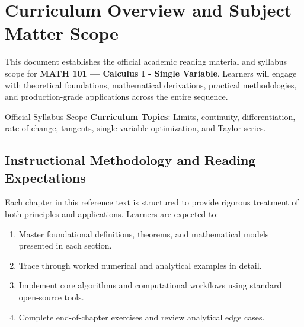 \section{Curriculum Overview and Subject Matter Scope}

This document establishes the official academic reading material and syllabus scope for \textbf{MATH 101 --- Calculus I - Single Variable}. Learners will engage with theoretical foundations, mathematical derivations, practical methodologies, and production-grade applications across the entire sequence.

\begin{InsightBox}{Official Syllabus Scope}
  \textbf{Curriculum Topics}: Limits, continuity, differentiation, rate of change, tangents, single-variable optimization, and Taylor series.
\end{InsightBox}

\subsection{Instructional Methodology and Reading Expectations}

Each chapter in this reference text is structured to provide rigorous treatment of both principles and applications. Learners are expected to:
\begin{enumerate}
  \item Master foundational definitions, theorems, and mathematical models presented in each section.
  \item Trace through worked numerical and analytical examples in detail.
  \item Implement core algorithms and computational workflows using standard open-source tools.
  \item Complete end-of-chapter exercises and review analytical edge cases.
\end{enumerate}

